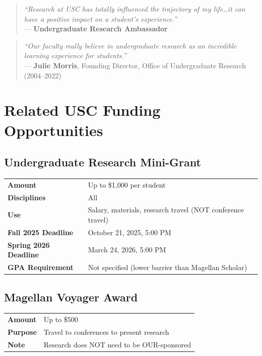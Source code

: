 \documentclass[11pt, letterpaper]{article}
\begin{document}
\begin{quote}
\textit{``Research at USC has totally influenced the trajectory of my life\ldots it can have a positive impact on a student's experience.''}\\
\hfill --- \textbf{Undergraduate Research Ambassador}
\end{quote}

\begin{quote}
\textit{``Our faculty really believe in undergraduate research as an incredible learning experience for students.''}\\
\hfill --- \textbf{Julie Morris}, Founding Director, Office of Undergraduate Research (2004--2022)
\end{quote}

\section{Related USC Funding Opportunities}

\subsection{Undergraduate Research Mini-Grant}

\begin{tabularx}{\textwidth}{@{}>{\bfseries}l X@{}}
\toprule
Amount & Up to \$1,000 per student \\
Disciplines & All \\
Use & Salary, materials, research travel (NOT conference travel) \\
Fall 2025 Deadline & October 21, 2025, 5:00 PM \\
Spring 2026 Deadline & March 24, 2026, 5:00 PM \\
GPA Requirement & Not specified (lower barrier than Magellan Scholar) \\
\bottomrule
\end{tabularx}

\subsection{Magellan Voyager Award}

\begin{tabularx}{\textwidth}{@{}>{\bfseries}l X@{}}
\toprule
Amount & Up to \$500 \\
Purpose & Travel to conferences to present research \\
Note & Research does NOT need to be OUR-sponsored \\
\bottomrule
\end{tabularx}
\end{document}
